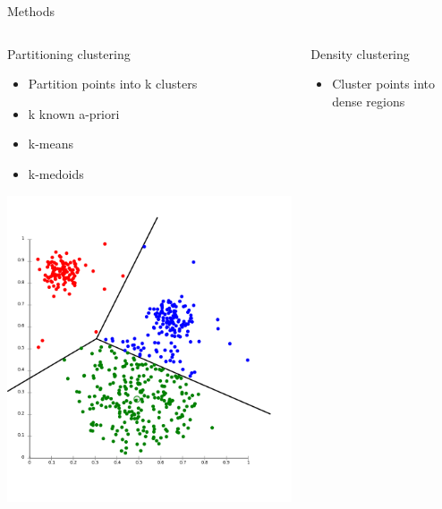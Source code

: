 \documentclass{beamer}\usepackage[]{graphicx}\usepackage[]{color}
\begin{document}
\begin{frame}[fragile]{Methods}
  \begin{columns}[t]
    \begin{column}{.32\linewidth}
      \begin{block}{Partitioning clustering}
        \begin{itemize}
          \item Partition points into k clusters
          \item k known a-priori
          \item k-means
          \item k-medoids
        \end{itemize}
        \begin{center}
          \includegraphics[width=\linewidth]{clust_part.png}
        \end{center}
      \end{block}
    \end{column}
    \begin{column}{.32\linewidth}
      \begin{block}{Density clustering}
        \begin{itemize}
          \item Cluster points into dense regions

\end{itemize}
\end{block}
\end{column}
\end{columns}
\end{frame}
\end{document}
